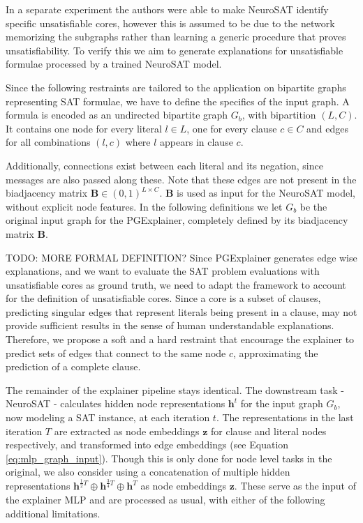 In a separate experiment the authors were able to make NeuroSAT identify specific unsatisfiable cores, however this is assumed to be due to the network memorizing the subgraphs rather than learning a generic procedure that proves unsatisfiability. To verify this we aim to generate explanations for unsatisfiable formulae processed by a trained NeuroSAT model.

Since the following restraints are tailored to the application on bipartite graphs representing SAT formulae, we have to define the specifics of the input graph. A formula is encoded as an undirected bipartite graph $G_b$, with bipartition $(L,C)$. It contains one node for every literal $l \in L$, one for every clause $c \in C$ and edges for all combinations $(l,c)$ where $l$ appears in clause $c$. 

Additionally, connections exist between each literal and its negation, since messages are also passed along these. Note that these edges are not present in the biadjacency matrix $\mathbf{B}\in (0,1)^{L\times C}$. $\mathbf{B}$ is used as input for the NeuroSAT model, without explicit node features. In the following definitions we let $G_b$ be the original input graph for the PGExplainer, completely defined by its biadjacency matrix $\mathbf{B}$. \bigskip


TODO: MORE FORMAL DEFINITION?
Since PGExplainer generates edge wise explanations, and we want to evaluate the SAT problem evaluations with unsatisfiable cores as ground truth, we need to adapt the framework to account for the definition of unsatisfiable cores. Since a core is a subset of clauses, predicting singular edges that represent literals being present in a clause, may not provide sufficient results in the sense of human understandable explanations. Therefore, we propose a soft and a hard restraint that encourage the explainer to predict sets of edges that connect to the same node $c$, approximating the prediction of a complete clause.

The remainder of the explainer pipeline stays identical. The downstream task - NeuroSAT - calculates hidden node representations $\mathbf{h}^t$ for the input graph $G_b$, now modeling a SAT instance, at each iteration $t$. The representations in the last iteration $T$ are extracted as node embeddings $\mathbf{z}$ for clause and literal nodes respectively, and transformed into edge embeddings (see Equation \ref{eq:mlp_graph_input}). Though this is only done for node level tasks in the original, we also consider using a concatenation of multiple hidden representations $\mathbf{h}^{\frac{1}{2}T} \oplus \mathbf{h}^{\frac{3}{4}T} \oplus \mathbf{h}^T$ as node embeddings $\mathbf{z}$. These serve as the input of the explainer MLP and are processed as usual, with either of the following additional limitations. \bigskip


